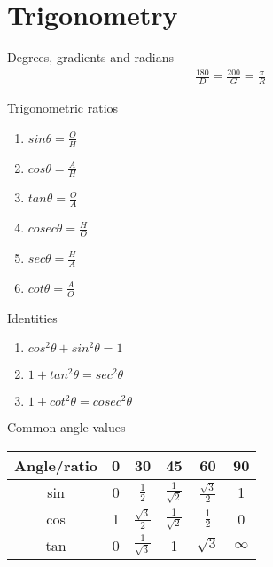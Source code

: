 \documentclass[titlepage, 12pt]{book}
\begin{document}
\chapter{Trigonometry}

\begin{theorem}{Degrees, gradients and radians}{}
    \begin{align*}
    \frac{180}{D} = \frac{200}{G} = \frac{\pi}{R}
    \end{align*}
\end{theorem}

\begin{definition}{Trigonometric ratios}{}
    \begin{enumerate}
        \item $sin\theta = \frac{O}{H}$
        \item $cos\theta = \frac{A}{H}$
        \item $tan\theta = \frac{O}{A}$
        \item $cosec\theta = \frac{H}{O}$
        \item $sec\theta = \frac{H}{A}$
        \item $cot\theta = \frac{A}{O}$
    \end{enumerate}
\end{definition}

\begin{theorem}{Identities}{}
    \begin{enumerate}
        \item $cos^2\theta + sin^2\theta = 1$
        \item $1 + tan^2\theta = sec^2\theta$
        \item $1 + cot^2\theta = cosec^2\theta$
    \end{enumerate}
\end{theorem}

\begin{theorem}{Common angle values}{}

    \begin{center}
        \begin{tabular}{ |c|c|c|c|c|c| }
            \hline
            Angle/ratio & 0 & 30 & 45 & 60 & 90 \\
            \hline
            sin & 0 & $\frac{1}{2}$ & $\frac{1}{\sqrt{2}}$ & $\frac{\sqrt{3}}{2}$ & 1 \\
            \hline
            cos & 1 & $\frac{\sqrt{3}}{2}$ & $\frac{1}{\sqrt{2}}$ & $\frac{1}{2}$ & 0 \\
            \hline
            tan & 0 & $\frac{1}{\sqrt{3}}$ & 1 & $\sqrt{3}$ & $\infty$ \\
            \hline
        \end{tabular}
    \end{center}
\end{theorem}
\end{document}

